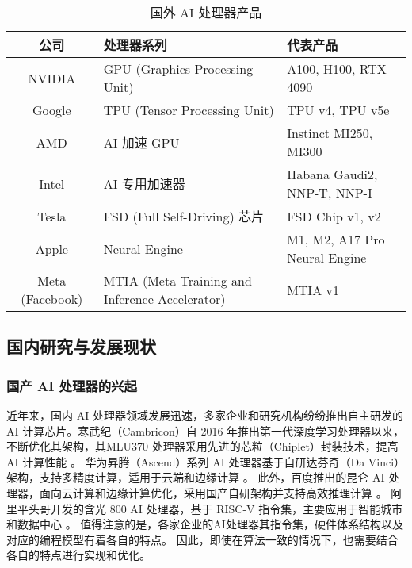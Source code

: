 \begin{table}
    \centering
    \caption{国外 AI 处理器产品}
    \label{tab:ai_chips}
    \begin{tabular}{cll} %
      \toprule
      公司   & 处理器系列                                       & 代表产品                          \\
      \midrule
      {NVIDIA} & GPU (Graphics Processing Unit) & A100, H100, RTX 4090 \\ 
      {Google} & TPU (Tensor Processing Unit) & TPU v4, TPU v5e \\ 
      {AMD} & AI 加速 GPU & Instinct MI250, MI300 \\ 
      {Intel} & AI 专用加速器 & Habana Gaudi2, NNP-T, NNP-I \\ 
      {Tesla} & FSD (Full Self-Driving) 芯片 & FSD Chip v1, v2 \\ 
      {Apple} & Neural Engine & M1, M2, A17 Pro Neural Engine \\ 
      {Meta (Facebook)} & MTIA (Meta Training and Inference Accelerator) & MTIA v1 \\
  
      \bottomrule
    \end{tabular}
\end{table}


\subsection{国内研究与发展现状}

\subsubsection{国产 AI 处理器的兴起}

近年来，国内 AI 处理器领域发展迅速，多家企业和研究机构纷纷推出自主研发的 AI 计算芯片。寒武纪（Cambricon）自 2016 年推出第一代深度学习处理器以来，
不断优化其架构，其MLU370 处理器采用先进的芯粒（Chiplet）封装技术，提高 AI 计算性能 \cite{song2023cambricon}。
华为昇腾（Ascend）系列 AI 处理器基于自研达芬奇（Da Vinci）架构，支持多精度计算，适用于云端和边缘计算 \cite{liao2021ascend}。
此外，百度推出的昆仑 AI 处理器，面向云计算和边缘计算优化，采用国产自研架构并支持高效推理计算 \cite{zhang2023intelligent}。
阿里平头哥开发的含光 800 AI 处理器，基于 RISC-V 指令集，主要应用于智能城市和数据中心 \cite{reuther2020survey}。
值得注意的是，各家企业的AI处理器其指令集，硬件体系结构以及对应的编程模型有着各自的特点。
因此，即使在算法一致的情况下，也需要结合各自的特点进行实现和优化。

